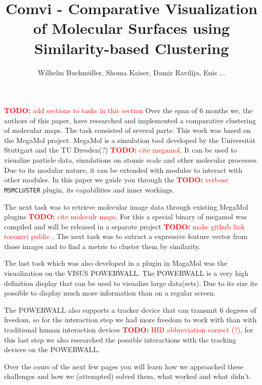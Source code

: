 \documentclass[journal]{vgtc}       %
\title{Comvi - Comparative Visualization of Molecular Surfaces using Similarity-based Clustering}
\author{Wilhelm Buchm\"uller, Shoma Kaiser, Damir Ravilija, Enis ...}
\newcommand{\todo}[1]{\textcolor{red}{\textbf{TODO:} #1}}
\begin{document}

\label{sec:intro}
%
\maketitle
%
\todo{add sections to tasks in this section}%
Over the span of 6 months we, the authors of this paper,  have researched and implemented a comparative clustering of molecular maps.
The task consisted of several parts: This work was based on the MegaMol project. MegaMol is a simulation tool developed by the Universität Stuttgart and the TU Dresden(?) \todo{cite megamol}. It can be used to visualize particle data, simulations on atomic scale and other molecular processes. 
Due to its modular nature, it can be extended with modules to interact with other modules.
In this paper we guide you through the \todo{verbose} \verb|MSMCLUSTER| plugin, its capabilities and inner workings.

The next task was to retrieve molecular image data through existing MegaMol plugins \todo{cite moleculr maps}. For this a special binary of megamol was compiled and will be released in a separate project \todo{make github link tocomvi public }.
The next task was to extract a expressive feature vector from those images and to find a metric to cluster them by similarity.

The last task which was also developed in a plugin in MagaMol was the visualization on the VISUS POWERWALL. The POWERWALL is a very high definition display that can be used to visualize large data(sets). Due to its size its possible to display much more information than on a regular screen. 

The POWERWALL also supports a tracker device that can transmit 6 degrees of freedom, so for the interaction step we had more freedom to work with than with traditional human interaction devices  \todo{HID abbreviation correct (?)}, for this last step we also researched the possible interactions with the tracking devices on the POWERWALL.

Over the cours of the next few pages you will learn how we approached these challenges and how we (attempted) solved them, what worked and what didn't.
\end{document}
